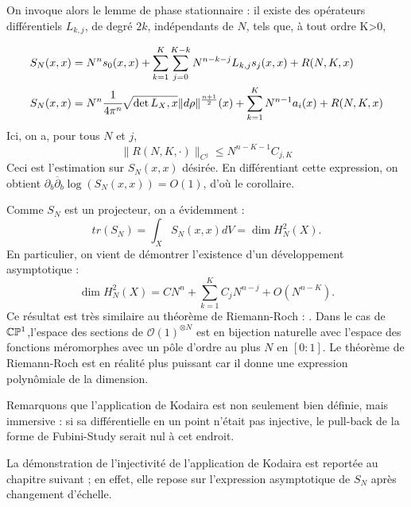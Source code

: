 On invoque alors le lemme de phase stationnaire : il existe des opérateurs différentiels $L_{k,j}$, de degré $2k$, indépendants de $N$, tels que, à tout ordre K>0, 

\begin{align*}
	S_N(x,x) &= N^n s_0(x,x) + \sum_{k=1}^{K}\sum_{j=0}^{K-k}N^{n-k-j}L_{k,j}s_j(x,x) + R(N,K,x)\\
		S_N(x,x) &= N^n \cfrac{1}{4\pi^n}\sqrt{\det{L_X,x}}\|d\rho\|^{\frac{n+1}{2}}(x) + \sum_{k=1}^K N^{n-1}a_i(x) + R(N,K,x)
\end{align*}
Ici, on a, pour tous $N$ et $j$,
\begin{equation*}
  \|R(N,K,\cdot)\|_{C^j} \leq N^{n-K-1}C_{j,K}
\end{equation*}
Ceci est l'estimation sur $S_N(x,x)$ désirée. En différentiant cette expression, on obtient $\partial_b\overline{\partial}_b \log(S_N(x,x)) = O(1)$, d'où le corollaire.

\begin{rem}
Comme $S_N$ est un projecteur, on a évidemment :
\begin{equation}
  tr(S_N) = \int_XS_N(x,x)dV=\dim H^2_N(X).
\end{equation}
En particulier, on vient de démontrer l'existence d'un développement asymptotique :
\begin{equation}
  \dim H^2_N(X) = CN^n+\sum_{k=1}^{K}C_jN^{n-j} + O(N^{n-K}).
\end{equation}
Ce résultat est très similaire au théorème de Riemann-Roch : \cite{source}. Dans le cas de $\mathbb{C}\mathbb{P}^1$,l'espace des sections de $\mathcal{O}(1)^{\otimes N}$ est en bijection naturelle avec l'espace des fonctions méromorphes avec un pôle d'ordre au plus $N$ en $[0:1]$. Le théorème de Riemann-Roch est en réalité plus puissant car il donne une expression polynômiale de la dimension.
\end{rem}

Remarquons que l'application de Kodaira est non seulement bien définie, mais immersive : si sa différentielle en un point n'était pas injective, le pull-back de la forme de Fubini-Study serait nul à cet endroit.

La démonstration de l'injectivité de l'application de Kodaira est reportée au chapitre suivant ; en effet, elle repose sur l'expression asymptotique de $S_N$ après changement d'échelle.
